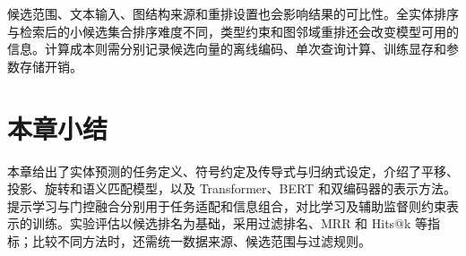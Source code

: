 候选范围、文本输入、图结构来源和重排设置也会影响结果的可比性。全实体排序与检索后的小候选集合排序难度不同，类型约束和图邻域重排还会改变模型可用的信息。计算成本则需分别记录候选向量的离线编码、单次查询计算、训练显存和参数存储开销。

\section{本章小结}

本章给出了实体预测的任务定义、符号约定及传导式与归纳式设定，介绍了平移、投影、旋转和语义匹配模型，以及 Transformer、BERT 和双编码器的表示方法。提示学习与门控融合分别用于任务适配和信息组合，对比学习及辅助监督则约束表示的训练。实验评估以候选排名为基础，采用过滤排名、MRR 和 Hits@k 等指标；比较不同方法时，还需统一数据来源、候选范围与过滤规则。
